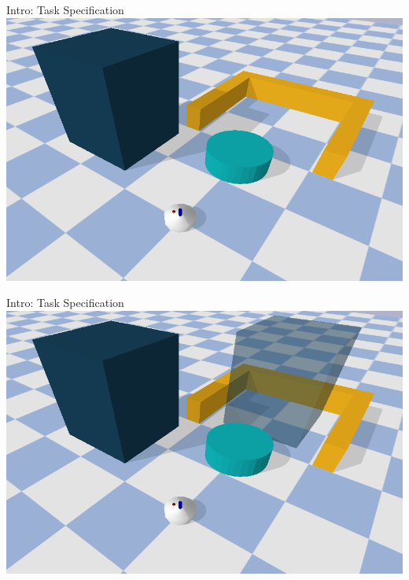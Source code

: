 \begin{frame}[fragile]{Intro: Task Specification}
\includegraphics[width=1.0\textwidth]{figures/introduction/blockade}
\end{frame}

\begin{frame}[fragile]{Intro: Task Specification}
\includegraphics[width=1.0\textwidth]{figures/introduction/blockade_with_target}
\end{frame}

